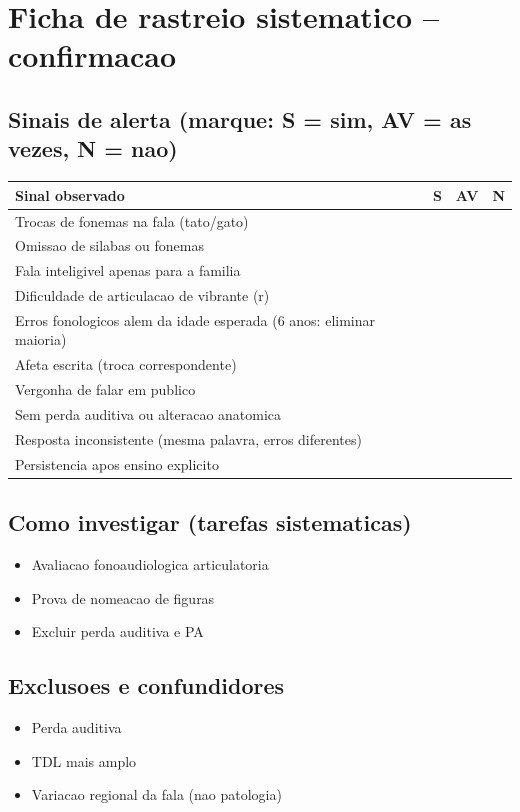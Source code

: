 \documentclass[a4paper,11pt]{book}
\begin{document}
\section*{Ficha de rastreio sistematico -- confirmacao}
\subsection*{Sinais de alerta (marque: S = sim, AV = as vezes, N = nao)}
\begin{tabular}{@{}p{11.5cm}ccc@{}}\toprule
Sinal observado & S & AV & N \\\midrule
Trocas de fonemas na fala (tato/gato) & & & \\
Omissao de silabas ou fonemas & & & \\
Fala inteligivel apenas para a familia & & & \\
Dificuldade de articulacao de vibrante (r) & & & \\
Erros fonologicos alem da idade esperada (6 anos: eliminar maioria) & & & \\
Afeta escrita (troca correspondente) & & & \\
Vergonha de falar em publico & & & \\
Sem perda auditiva ou alteracao anatomica & & & \\
Resposta inconsistente (mesma palavra, erros diferentes) & & & \\
Persistencia apos ensino explicito & & & \\
\bottomrule\end{tabular}
\subsection*{Como investigar (tarefas sistematicas)}
\begin{itemize}
\item Avaliacao fonoaudiologica articulatoria
\item Prova de nomeacao de figuras
\item Excluir perda auditiva e PA
\end{itemize}
\subsection*{Exclusoes e confundidores}
\begin{itemize}
\item Perda auditiva
\item TDL mais amplo
\item Variacao regional da fala (nao patologia)
\end{itemize}
\end{document}

